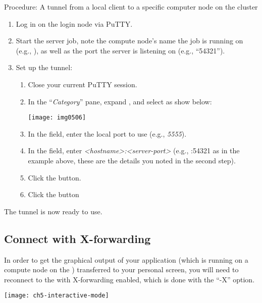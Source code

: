   Procedure: A tunnel from a local client to a specific computer node on the cluster

  \begin{enumerate}
    \item  Log in on the login node via PuTTY.
    \item  Start the server job, note the compute node's name the job is running
    on (e.g., \computenode), as well as the port the server is listening on
  (e.g., ``54321'').
    \item  Set up the tunnel:

        \begin{enumerate}
          \item Close your current PuTTY session.
          \item In the ``\emph{Category}'' pane, expand , and select  as show below:

  \begin{center}
  \texttt{[image: img0506]}
  \end{center}

    \item  In the  field, enter the local port to use (e.g., \emph{5555}).
    \item  In the  field, enter \emph{<{}hostname>{}:<{}server-port>{}}
    (e.g., \computenode:54321 as in the example above, these are the details you noted in the second step).
    \item  Click the  button.
    \item  Click the  button
  \end{enumerate}
\end{enumerate}

  The tunnel is now ready to use.
\fi %

\ifmacORlinux
\subsection{Connect with X-forwarding}

In order to get the graphical output of your application (which is running on a
compute node on the \hpc) transferred to your personal screen, you will need
to reconnect to the \hpc with X-forwarding enabled, which is done with the
``-X'' option.

\begin{center}
\texttt{[image: ch5-interactive-mode]}
\end{center}

